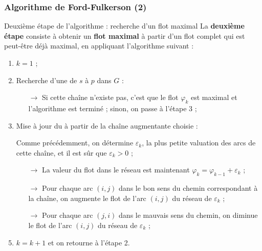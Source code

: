 \documentclass[french,10pt,t,handout]{beamer}
\begin{document}
\begin{frame}%
	\frametitle{Algorithme de Ford-Fulkerson (2)}

	\begin{block}{Deuxi\`eme \'etape de l'algorithme : recherche d'un flot maximal}
		La \textbf{deuxi\`eme \'etape} consiste \`a obtenir un \textbf{flot maximal}
		\`a partir d'un flot complet qui est peut-\^etre d\'ej\`a maximal, en
		appliquant l'algorithme suivant :
		\small
		\begin{enumerate}
		  \item $k = 1$ ;
		  \item Recherche d'une  de $s$ \`a $p$ dans
		  $G$ :
		  	\begin{itemize}
		  		\item[$\rightarrow$] Si cette cha\^ine n'existe pas, c'est que le flot
		  		$\varphi_k$ est maximal et l'algorithme est termin\'e ; 
		  		sinon, on passe \`a l'\'etape 3 ;
		  	\end{itemize}
		  \item Mise \`a jour du  \`a partir de
		  		la cha\^ine augmentante choisie :
		  \item[] Comme pr\'ec\'edemment, on d\'etermine $\varepsilon_k$, la plus petite valuation des arcs de cette cha\^ine,
		  		et il est s\^ur que $\varepsilon_k > 0$ ;
		  	\begin{itemize}
		  	  	\item[$\rightarrow$] La valeur du flot dans le r\'eseau est maintenant
		  	  						$\varphi_k = \varphi_{k-1} + \varepsilon_k$ ;
		  		\item[$\rightarrow$] Pour chaque arc $(i,j)$ dans le bon sens du chemin
		  							correspondant \`a la cha\^ine, on augmente le flot de l'arc $(i,j)$
		  							du r\'eseau de $\varepsilon_k$ ;
		  		\item[$\rightarrow$] Pour chaque arc $(j,i)$ dans le mauvais sens du
		  							chemin, on diminue le flot de l'arc $(i,j)$ du r\'eseau de
		  							$\varepsilon_k$ ;
		  	\end{itemize}		  
		  \item $k = k+1$ et on retourne \`a l'\'etape 2.
		\end{enumerate}
	\end{block}
\end{frame}
\end{document}
